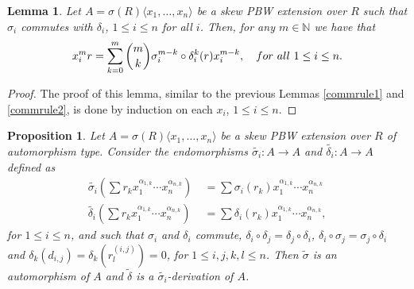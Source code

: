 \documentclass{amsart}
\newtheorem{lemma}[theorem]{Lemma}
\newtheorem{proposition}[theorem]{Proposition}
\theoremstyle{definition}
\theoremstyle{remark}
\numberwithin{equation}{section}
\begin{document}
\begin{lemma}
Let $A=\sigma(R)\langle x_1, \dotsc, x_n \rangle$ be a skew PBW extension over $R$ such that $\sigma_i$ commutes with $\delta_i$, $1\leq i \leq n$ for all $i$. Then, for any $m \in \mathbb{N}$ we have that
\begin{equation*}
x_i^mr=\sum_{k=0}^{m}\binom{m}{k}\sigma_i^{m-k}\circ\delta_i^{k}(r)x_i^{m-k}, \quad {\rm for\ all}\ 1\leq i\leq n.
\end{equation*}
\end{lemma}
\begin{proof}
The proof of this lemma, similar to the previous Lemmas \ref{commrule1} and \ref{commrule2}, is done by induction on each $x_i$, $1\leq i \leq n$. 
\end{proof}

\begin{proposition}\label{extaautoSPBWn}
Let $A=\sigma(R)\langle x_1,\ldots, x_n \rangle$ be a skew PBW extension over $R$ of automorphism type. Consider the endomorphisms $\widetilde{\sigma_i}:A \rightarrow A$ and $\widetilde{\delta_i}:A\rightarrow A$ defined as
\begin{align*}
    \widetilde{\sigma_i}\left(\sum r_kx_1^{\alpha_{1,k}}\cdots x_n^{\alpha_{n,k}}\right) &\ = \sum \sigma_i(r_k)x_1^{\alpha_{1,k}}\cdots x_n^{\alpha_{n,k}} \\
    \widetilde{\delta_i}\left(\sum r_kx_1^{\alpha_{1,k}}\cdots x_n^{\alpha_{n,k}}\right) &\ = \sum \delta_i(r_k)x_1^{\alpha_{1,k}}\cdots x_n^{\alpha_{n,k}},
\end{align*}
 for $1 \leq i \leq n$, and such that $\sigma_i$ and $\delta_i$ commute, $\delta_i\circ\delta_j=\delta_j\circ\delta_i$,  $\delta_i\circ\sigma_j=\sigma_j\circ\delta_i$ and $\delta_k(d_{i,j})=\delta_k(r_l^{(i,j)})=0$, for $1 \leq i, j, k, l \leq n$. Then $\widetilde{\sigma}$ is an automorphism of $A$ and $\widetilde{\delta}$ is a $\widetilde{\sigma_i}$-derivation of $A$.
\end{proposition}
\end{document}
